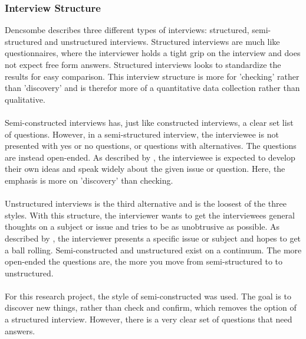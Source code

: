 \documentclass{cslthse-msc}
\begin{document}
    \subsubsection{Interview Structure}
    Dencsombe describes three different types of interviews: structured, semi-structured and
    unstructured interviews. Structured interviews are much like questionnaires, where
    the interviewer holds a tight grip on the interview and does not expect free form answers.
    Structured interviews looks to standardize the results for easy comparison.
    This interview structure is more for 'checking' rather than 'discovery' and is
    therefor more of a quantitative data collection rather than qualitative.
    \\ \\
    Semi-constructed interviews has, just like constructed interviews, a clear set
    list of questions. However, in a semi-structured interview, the interviewee
    is not presented with yes or no questions, or questions with alternatives.
    The questions are instead open-ended. As described by \citet{denscombe}, the interviewee
    is expected to develop their own ideas and speak widely about the given issue or question.
    Here, the emphasis is more on 'discovery' than checking.
    \\ \\
    Unstructured interviews is the third alternative and is the loosest of the three styles.
    With this structure, the interviewer wants to get the interviewees general thoughts
    on a subject or issue and tries to be as unobtrusive as possible. As described by \citet{denscombe},
    the interviewer presents a specific issue or subject and hopes to get a ball rolling.
    Semi-constructed and unstructured exist on a continuum. The more open-ended the questions
    are, the more you move from semi-structured to to unstructured.
    \\ \\
    For this research project, the style of semi-constructed was used.
    The goal is to discover new things, rather than check and confirm, which removes the option
    of a structured interview. However, there is a very clear set of questions
    that need answers.
\end{document}
